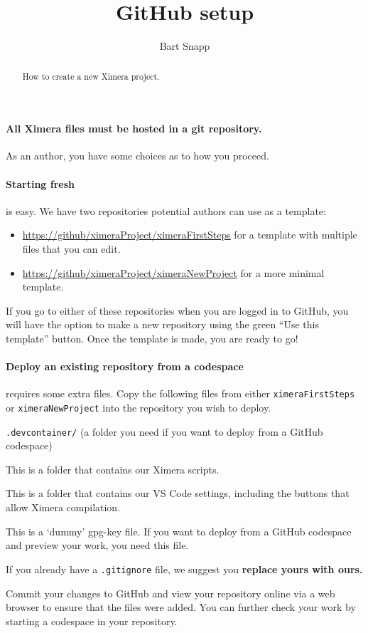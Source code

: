 \documentclass{ximera}
\title{GitHub setup}
\author{Bart Snapp}
\begin{document}
\begin{abstract}
    How to create a new Ximera project.
\end{abstract}
\maketitle

\paragraph{All Ximera files must be hosted in a git repository.}
As an author, you have some choices as to how you proceed.

\paragraph{Starting fresh} is easy.
We have two repositories potential authors can use as a template:
\begin{itemize}
    \item \url{https://github/ximeraProject/ximeraFirstSteps} for a template
          with multiple files that you can edit.
    \item \url{https://github/ximeraProject/ximeraNewProject} for a more
          minimal template.
\end{itemize}
If you go to either of these repositories when you are logged in to GitHub, you
will have the option to make a new repository using the green ``Use this
template'' button. Once the template is made, you are ready to go!

\paragraph{Deploy an existing repository from a codespace} requires some
extra files. Copy the
following files from either \verb!ximeraFirstSteps! or \verb!ximeraNewProject!
into the repository you wish to deploy.
\begin{description}
    \item \texttt{.devcontainer/} (a folder you need if you want to deploy from
          a
          GitHub codespace)
    \item[\texttt{xmScripts/}] This is a folder that contains our Ximera
        scripts.
    \item[\texttt{.vscode/}] This is a folder that contains our VS Code
        settings, including the buttons that allow Ximera compilation.
    \item[\texttt{.xmKeyFile}] This is a `dummy' gpg-key file. If you want to
        deploy from a GitHub codespace and preview your work, you need this
        file.
    \item[\texttt{.gitignore}]	If you already have a \verb|.gitignore| file,
        we suggest
        you \textbf{replace yours with ours.}
\end{description}
Commit your changes to GitHub and view your repository online via a web browser
to ensure that the files were added.
You can further check your work by starting a codespace in your repository.
\end{document}
